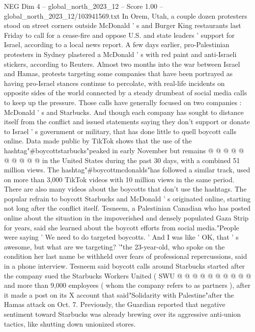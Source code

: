 \begin{textsample}{NEG Dim 4 – global\_north\_2023\_12 – Score 1.00 – global\_north\_2023\_12/103941569.txt}  \label{ex:f4_neg_154}
In Orem, Utah, a couple dozen protesters stood on street corners outside McDonald ' s and Burger King restaurants last Friday to call for a cease-fire and oppose U.S. and state leaders ' support for Israel, according to a local news report.
A few days earlier, pro-Palestinian protesters in Sydney plastered a McDonald ' s with red paint and anti-Israeli stickers, according to Reuters.
Almost two months into the war between Israel and Hamas, protests targeting some companies that have been portrayed as having pro-Israel stances continue to percolate, with real-life incidents on opposite sides of the world connected by a steady drumbeat of social media calls to keep up the pressure.
Those calls have generally focused on two companies : McDonald ' s and Starbucks.
And though each company has sought to distance itself from the conflict and issued statements saying they don't support or donate to Israel ' s government or military, that has done little to quell boycott calls online.
Data made public by TikTok shows that the use of the hashtag"\#boycottstarbucks"peaked in early November but remains @ @ @ @ @ @ @ @ @ @ in the United States during the past 30 days, with a combined 51 million views.
The hashtag"\#boycottmcdonalds"has followed a similar track, used on more than 3,000 TikTok videos with 10 million views in the same period.
There are also many videos about the boycotts that don't use the hashtags.
The popular refrain to boycott Starbucks and McDonald ' s originated online, starting not long after the conflict itself.
Tesneem, a Palestinian Canadian who has posted online about the situation in the impoverished and densely populated Gaza Strip for years, said she learned about the boycott efforts from social media."People were saying ' We need to do targeted boycotts. ' And I was like ' OK, that ' s awesome, but what are we targeting? '"the 23-year-old, who spoke on the condition her last name be withheld over fears of professional repercussions, said in a phone interview.
Tesneem said boycott calls around Starbucks started after the company sued the Starbucks Workers United ( SWU @ @ @ @ @ @ @ @ @ @ and more than 9,000 employees ( whom the company refers to as partners ), after it made a post on its X account that said"Solidarity with Palestine"after the Hamas attack on Oct. 7.
Previously, the Guardian reported that negative sentiment toward Starbucks was already brewing over its aggressive anti-union tactics, like shutting down unionized stores.

\end{textsample}
